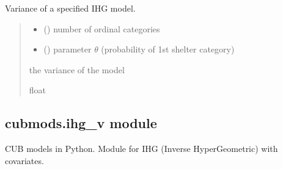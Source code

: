 \documentclass[letterpaper,10pt,english]{sphinxmanual}
\begin{document}
\begin{fulllineitems}
\label{\detokenize{cubmods:cubmods.ihg.var}}
\pysigstartsignatures
{}
\pysigstopsignatures
\sphinxAtStartPar
Variance of a specified IHG model.
\begin{quote}\begin{description}
\begin{itemize}
\item {} 
\sphinxAtStartPar
{} () \textendash{} number of ordinal categories

\item {} 
\sphinxAtStartPar
{} () \textendash{} parameter \(\theta\) (probability of 1st shelter category)

\end{itemize}

\sphinxAtStartPar
the variance of the model

\sphinxAtStartPar
float

\end{description}\end{quote}

\end{fulllineitems}



\subsection{cubmods.ihg\_v module}
\label{\detokenize{cubmods:module-cubmods.ihg_v}}\label{\detokenize{cubmods:cubmods-ihg-v-module}}\label{\detokenize{cubmods:ihgv-module}}
\sphinxAtStartPar
CUB models in Python.
Module for IHG (Inverse HyperGeometric) with covariates.
\end{document}
